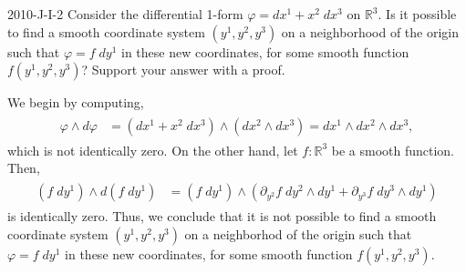 \documentclass{article}
\begin{document}
	\begin{prb}{2010-J-I-2}
		Consider the differential 1-form $\varphi = dx^{1} + x^{2}\;dx^{3}$ on $\mathbb{R}^{3}$. Is it possible to find a smooth coordinate system $(y^{1}, y^{2}, y^{3})$ on a neighborhood of the origin such that $\varphi = f\;dy^{1}$ in these new coordinates, for some smooth function $f(y^{1}, y^{2}, y^{3})$? Support your answer with a proof. 
	\end{prb}
	We begin by computing, 
	\begin{align*}
		\begin{split}
			\varphi \wedge d\varphi &= (dx^{1} + x^{2}\;dx^{3}) \wedge (dx^{2} \wedge dx^{3}) = dx^{1} \wedge dx^{2} \wedge dx^{3}, 
		\end{split}
	\end{align*}
	which is not identically zero. On the other hand, let $f: \mathbb{R}^{3}$ be a smooth function. Then, 
	\begin{align*}
		\begin{split}
			(f\;dy^{1}) \wedge d(f\;dy^{1}) &= (f\;dy^{1}) \wedge \left(\partial_{y^{2}}f\;dy^{2} \wedge dy^{1} + \partial_{y^{3}}f\;dy^{3} \wedge dy^{1}\right)
		\end{split}
	\end{align*}
	is identically zero. Thus, we conclude that it is not possible to find a smooth coordinate system $(y^{1}, y^{2}, y^{3})$ on a neighborhod of the origin such that $\varphi = f\;dy^{1}$ in these new coordinates, for some smooth function $f(y^{1}, y^{2}, y^{3})$. 
	
\end{document}
